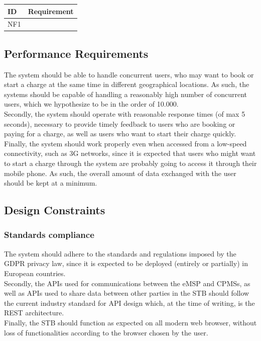 \documentclass[11pt]{article}
\begin{document}
\begin{table}[H]
    \centering
    \setlength{\tabcolsep}{18pt}
    \renewcommand{\arraystretch}{1.2}
    \begin{tabularx}{\textwidth}{|>{\centering\hsize=0.3\hsize}X|>{\hsize=1.7\hsize}X|}
        \hline
        \textbf{ID} & \textbf{Requirement} \\
        \hline
        NF1 &  \\
        \hline
    \end{tabularx}
    \label{tab:performanceRequirements}
\end{table}

\subsection{Performance Requirements}
The system should be able to handle concurrent users, who may want to book or start a charge at the same time in different geographical locations. As such, the systems should be capable of handling a reasonably high number of concurrent users, which we hypothesize to be in the order of 10.000. \\
Secondly, the system should operate with reasonable response times (of max 5 seconds), necessary to provide timely feedback to users who are booking or paying for a charge, as well as users who want to start their charge quickly. \\
Finally, the system should work properly even when accessed from a low-speed connectivity, such as 3G networks, since it is expected that users who might want to start a charge through the system are probably going to access it through their mobile phone. As such, the overall amount of data exchanged with the user should be kept at a minimum. \\

\subsection{Design Constraints}
\subsubsection{Standards compliance}
The system should adhere to the standards and regulations imposed by the GDPR privacy law, since it is expected to be deployed (entirely or partially) in European countries. \\
Secondly, the APIs used for communications between the eMSP and CPMSs, as well as APIs used to share data between other parties in the STB should follow the current industry standard for API design which, at the time of writing, is the REST architecture. \\
Finally, the STB should function as expected on all modern web browser, without loss of functionalities according to the browser chosen by the user. 
\end{document}
